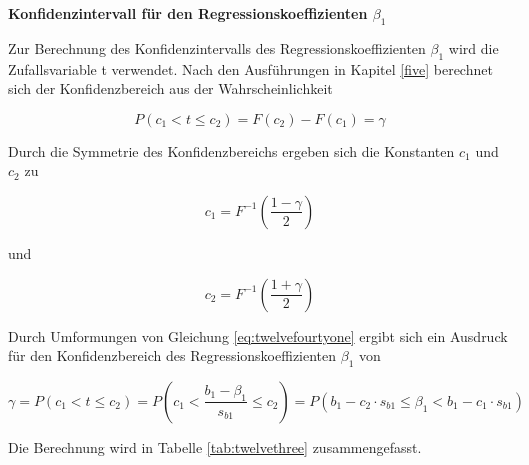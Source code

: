 {\selectfont
\noindent\textbf{Konfidenzintervall f\"{u}r den Regressionskoeffizienten $\beta_{1}$}}\smallskip

\noindent Zur Berechnung des Konfidenzintervalls des Regressionskoeffizienten $\beta_{1}$ wird die Zufallsvariable t verwendet. Nach den Ausf\"{u}hrungen in Kapitel \ref{five} berechnet sich der Konfidenzbereich aus der Wahrscheinlichkeit

\begin{equation}\label{eq:twelvefourtyone}
P(c_{1} <t\le c_{2})=F(c_{2})-F(c_{1})=\gamma
\end{equation}

\noindent Durch die Symmetrie des Konfidenzbereichs ergeben sich die Konstanten $c_{1}$ und $c_{2}$ zu

\begin{equation}\label{eq:twelvefourtytwo}
c_{1} =F^{-1} \left(\dfrac{1-\gamma }{2} \right)
\end{equation}

\noindent und

\begin{equation}\label{eq:twelvefourtythree}
c_{2} =F^{-1} \left(\dfrac{1+\gamma }{2} \right)
\end{equation}

\noindent Durch Umformungen von Gleichung \eqref{eq:twelvefourtyone} ergibt sich ein Ausdruck f\"{u}r den Konfidenzbereich des Regressionskoeffizienten $\beta_{1}$ von

\begin{equation}\label{eq:twelvefourtyfour}
\gamma =P(c_{1} <t\le c_{2})=P\left(c_{1} <\dfrac{b_{1} -\beta _{1} }{s_{b1}} \le c_{2} \right)=P(b_{1} -c_{2} \cdot s_{b1} \le \beta _{1} <b_{1} -c_{1} \cdot s_{b1})
\end{equation}

\noindent Die Berechnung wird in Tabelle \ref{tab:twelvethree} zusammengefasst.

\clearpage

